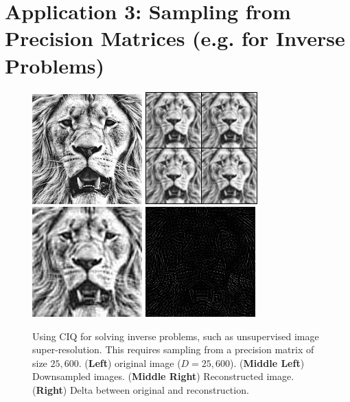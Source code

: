 \section{Application 3: Sampling from Precision Matrices (e.g. for Inverse Problems)}


\begin{figure}[t!]
  \centering
  \includegraphics[width=0.24\linewidth]{figures/lion160.png}
  \includegraphics[width=0.24\linewidth]{figures/init_lion160.png}
  \includegraphics[width=0.24\linewidth]{figures/posterior_lion160.png}
  \includegraphics[width=0.24\linewidth]{figures/delta_lion160.png}
  \caption{
    Using CIQ for solving inverse problems, such as unsupervised image super-resolution.
    This requires sampling from a precision matrix of size $25,\!600$.
    ({\bf Left}) original image ($D=25,\!600$).
    ({\bf Middle Left}) Downsampled images.
    ({\bf Middle Right}) Reconstructed image.
    ({\bf Right}) Delta between original and reconstruction.
  }
  \label{fig:robotics}
\end{figure}


\cite{griffin2017hierarchical}
\cite{bardsley2012mcmc}
\cite{waller1997hierarchical}
\cite{besag1991bayesian}
\cite{knorr2002block}
\cite{chipman1996bayesian}
